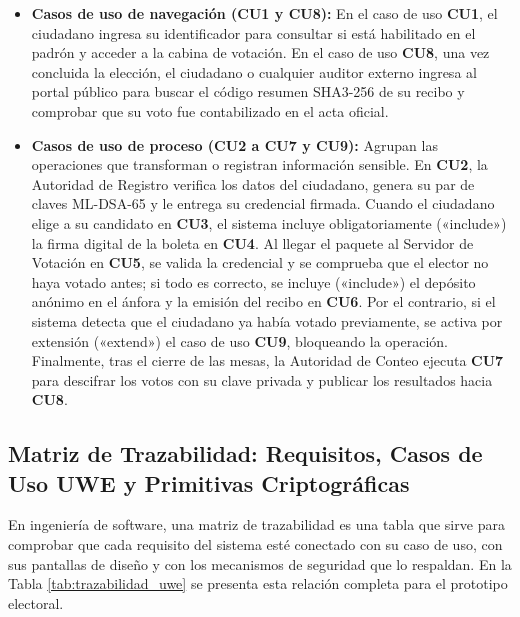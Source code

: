 \begin{itemize}
	\item \textbf{Casos de uso de navegación (CU1 y CU8):} En el caso de uso \textbf{CU1}, el ciudadano ingresa su identificador para consultar si está habilitado en el padrón y acceder a la cabina de votación. En el caso de uso \textbf{CU8}, una vez concluida la elección, el ciudadano o cualquier auditor externo ingresa al portal público para buscar el código resumen SHA3-256 de su recibo y comprobar que su voto fue contabilizado en el acta oficial.

	\item \textbf{Casos de uso de proceso (CU2 a CU7 y CU9):} Agrupan las operaciones que transforman o registran información sensible. En \textbf{CU2}, la Autoridad de Registro verifica los datos del ciudadano, genera su par de claves ML-DSA-65 y le entrega su credencial firmada. Cuando el ciudadano elige a su candidato en \textbf{CU3}, el sistema incluye obligatoriamente ({\small «include»}) la firma digital de la boleta en \textbf{CU4}. Al llegar el paquete al Servidor de Votación en \textbf{CU5}, se valida la credencial y se comprueba que el elector no haya votado antes; si todo es correcto, se incluye ({\small «include»}) el depósito anónimo en el ánfora y la emisión del recibo en \textbf{CU6}. Por el contrario, si el sistema detecta que el ciudadano ya había votado previamente, se activa por extensión ({\small «extend»}) el caso de uso \textbf{CU9}, bloqueando la operación. Finalmente, tras el cierre de las mesas, la Autoridad de Conteo ejecuta \textbf{CU7} para descifrar los votos con su clave privada y publicar los resultados hacia \textbf{CU8}.
\end{itemize}

\subsection{Matriz de Trazabilidad: Requisitos, Casos de Uso UWE y Primitivas Criptográficas}
\label{subsec:matriz_trazabilidad_uwe}

En ingeniería de software, una matriz de trazabilidad es una tabla que sirve para comprobar que cada requisito del sistema esté conectado con su caso de uso, con sus pantallas de diseño y con los mecanismos de seguridad que lo respaldan. En la Tabla \ref{tab:trazabilidad_uwe} se presenta esta relación completa para el prototipo electoral.

